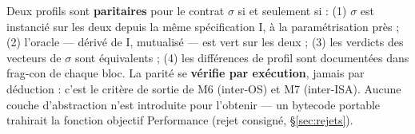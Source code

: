 Deux profils sont \textbf{paritaires} pour le contrat $\sigma$ si et seulement si :
(1) $\sigma$ est instancié sur les deux depuis la même spécification I, à la
paramétrisation près ; (2) l’oracle — dérivé de I, mutualisé — est vert sur les deux ;
(3) les verdicts des vecteurs de $\sigma$ sont équivalents ; (4) les différences de profil
sont documentées dans frag-con de chaque bloc. La parité se \textbf{vérifie par
exécution}, jamais par déduction : c’est le critère de sortie de M6 (inter-OS) et M7
(inter-ISA). Aucune couche d’abstraction n’est introduite pour l’obtenir — un bytecode
portable trahirait la fonction objectif Performance (rejet consigné, §\ref{sec:rejets}).
